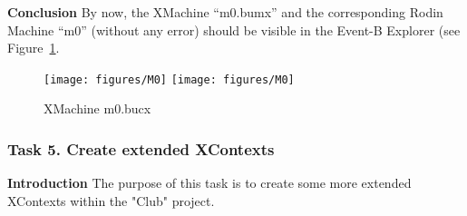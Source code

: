\textbf{Conclusion} By now, the XMachine ``m0.bumx'' and the corresponding Rodin Machine ``m0'' (without any error) should be visible in the Event-B Explorer (see Figure~\ref{fig:M0}.
  \begin{figure}[!htbp]
    \centering
    \texttt{[image: figures/M0]}
    \else
    \texttt{[image: figures/M0]}
    \endif
    \caption{XMachine m0.bucx}
    \label{fig:M0}
  \end{figure}

\subsubsection{Task 5. Create extended XContexts}
\textbf{Introduction} The purpose of this task is to create some more extended XContexts within the "Club" project.

